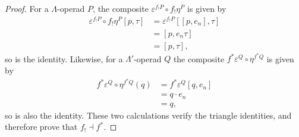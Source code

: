 \begin{proof}
For a $\Lambda$-operad $P$, the composite $\varepsilon^{f_{!}P} \circ f_{!}\eta^{P}$ is given by
\begin{align*}
\varepsilon^{f_{!}P} \circ f_{!}\eta^{P}[p, \tau] & = \varepsilon^{f_{!}P}\left[ [p,e_n], \tau\right] \\
& = [p, e_n \tau]\\
& = [p, \tau],
\end{align*}
so is the identity. Likewise, for a $\Lambda'$-operad $Q$ the composite $f^*\varepsilon^Q \circ \eta^{f^*Q}$ is given by
\begin{align*}
f^*\varepsilon^Q \circ \eta^{f^*Q}(q) & = f^*\varepsilon^Q[q,e_n] \\
& = q \cdot e_n \\
& = q,
\end{align*}
so is also the identity. These two calculations verify the triangle identities, and therefore prove that $f_{!} \dashv f^*$.
%
%
%
%
\end{proof}


